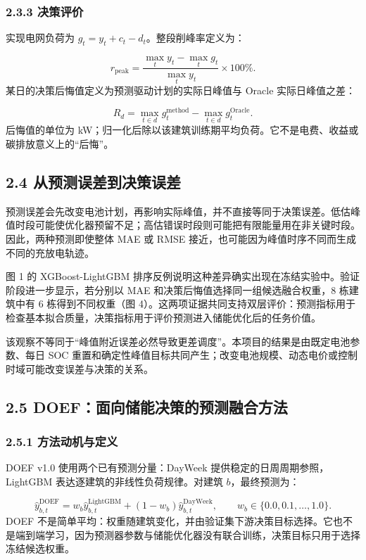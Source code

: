 \documentclass[12pt,a4paper]{article}
\begin{document}
\subsubsection{2.3.3 决策评价}
实现电网负荷为 \(g_t=y_t+c_t-d_t\)。整段削峰率定义为：\par
\[
r_{\text{peak}}=\frac{\max_t y_t-\max_t g_t}{\max_t y_t}\times100\%.
\]
某日的决策后悔值定义为预测驱动计划的实际日峰值与 Oracle 实际日峰值之差：\par
\[
R_d=\max_{t\in d}g_t^{\text{method}}-\max_{t\in d}g_t^{\text{Oracle}}.
\]
后悔值的单位为 kW；归一化后除以该建筑训练期平均负荷。它不是电费、收益或碳排放意义上的“后悔”。\par
\subsection{2.4 从预测误差到决策误差}
预测误差会先改变电池计划，再影响实际峰值，并不直接等同于决策误差。低估峰值时段可能使优化器预留不足；高估错误时段则可能把有限能量用在非关键时段。因此，两种预测即使整体 MAE 或 RMSE 接近，也可能因为峰值时序不同而生成不同的充放电轨迹。\par
图 1 的 XGBoost-LightGBM 排序反例说明这种差异确实出现在冻结实验中。验证阶段进一步显示，若分别以 MAE 和决策后悔值选择同一组候选融合权重，8 栋建筑中有 6 栋得到不同权重（图 4）。这两项证据共同支持双层评价：预测指标用于检查基本拟合质量，决策指标用于评价预测进入储能优化后的任务价值。\par
该观察不等同于“峰值附近误差必然导致更差调度”。本项目的结果是由既定电池参数、每日 SOC 重置和确定性峰值目标共同产生；改变电池规模、动态电价或控制时域可能改变误差与决策的关系。\par
\subsection{2.5 DOEF：面向储能决策的预测融合方法}
\subsubsection{2.5.1 方法动机与定义}
DOEF v1.0 使用两个已有预测分量：DayWeek 提供稳定的日周周期参照，LightGBM 表达逐建筑的非线性负荷规律。对建筑 \(b\)，最终预测为：\par
\[
\hat{y}_{b,t}^{\text{DOEF}}
=w_b\hat{y}_{b,t}^{\text{LightGBM}}
+(1-w_b)\hat{y}_{b,t}^{\text{DayWeek}},
\qquad w_b\in\{0.0,0.1,\ldots,1.0\}.
\]
DOEF 不是简单平均：权重随建筑变化，并由验证集下游决策目标选择。它也不是端到端学习，因为预测器参数与储能优化器没有联合训练，决策目标只用于选择冻结候选权重。\par
\end{document}
